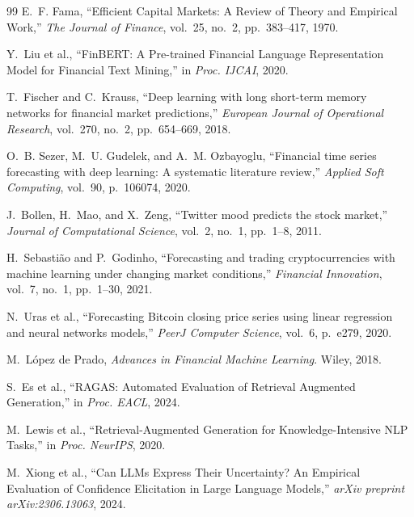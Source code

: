 \documentclass[12pt, a4paper]{report}
\begin{document}
\begin{thebibliography}{99}
  E.~F. Fama, ``Efficient Capital Markets: A Review of Theory and Empirical Work,''
  \textit{The Journal of Finance}, vol.~25, no.~2, pp.~383--417, 1970.

  Y.~Liu et al., ``FinBERT: A Pre-trained Financial Language Representation Model for Financial Text Mining,''
  in \textit{Proc. IJCAI}, 2020.

  T.~Fischer and C.~Krauss, ``Deep learning with long short-term memory networks for financial market predictions,''
  \textit{European Journal of Operational Research}, vol.~270, no.~2, pp.~654--669, 2018.

  O.~B. Sezer, M.~U. Gudelek, and A.~M. Ozbayoglu, ``Financial time series forecasting with deep learning: A systematic literature review,''
  \textit{Applied Soft Computing}, vol.~90, p.~106074, 2020.

  J.~Bollen, H.~Mao, and X.~Zeng, ``Twitter mood predicts the stock market,''
  \textit{Journal of Computational Science}, vol.~2, no.~1, pp.~1--8, 2011.

  H.~Sebastião and P.~Godinho, ``Forecasting and trading cryptocurrencies with machine learning under changing market conditions,''
  \textit{Financial Innovation}, vol.~7, no.~1, pp.~1--30, 2021.

  N.~Uras et al., ``Forecasting Bitcoin closing price series using linear regression and neural networks models,''
  \textit{PeerJ Computer Science}, vol.~6, p.~e279, 2020.

  M.~López de Prado, \textit{Advances in Financial Machine Learning}. Wiley, 2018.

  S.~Es et al., ``RAGAS: Automated Evaluation of Retrieval Augmented Generation,''
  in \textit{Proc. EACL}, 2024.

  M.~Lewis et al., ``Retrieval-Augmented Generation for Knowledge-Intensive NLP Tasks,''
  in \textit{Proc. NeurIPS}, 2020.

  M.~Xiong et al., ``Can LLMs Express Their Uncertainty? An Empirical Evaluation of Confidence Elicitation in Large Language Models,''
  \textit{arXiv preprint arXiv:2306.13063}, 2024.


\end{thebibliography}
\end{document}

